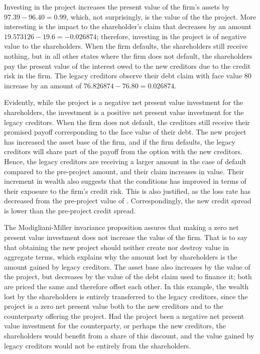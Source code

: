 \documentclass[main.tex]{subfiles}
\begin{document}
        Investing in the project increases the present value of the firm's assets by $\num{97.39} - \num{96.40} = \num{0.99}$, 
        which, not surprisingly, is the value of the the project.
        More interesting is the impact to the shareholder's claim that decreases by an amount $\num{19.573126} - \num{19.6} = \num{-0.026874}$; 
        therefore, investing in the project is of negative value to the shareholders.
        When the firm defaults, the shareholders still receive nothing, 
        but in all other states where the firm does not default, 
        the shareholders pay the present value of the interest owed to the new creditors 
        due to the credit risk in the firm.
        The legacy creditors observe their debt claim with face value $\num{80}$ increase by an amount of
        $\num{76.826874} - \num{76.80} = \num{0.026874}$.

        Evidently, while the project is a negative net present value investment for the shareholders,
        the investment is a positive net present value investment for the legacy creditors.
        When the firm does not default, the creditors still receive their promised payoff 
        corresponding to the face value of their debt.
        The new project has increased the asset base of the firm, and if the firm defaults, 
        the legacy creditors will share part of the payoff from the option with the new creditors.
        Hence, the legacy creditors are receiving a larger amount in the case of default compared to the pre-project amount, and their claim increases in value.
        Their increment in wealth also suggests that the conditions has improved in terms of their exposure to the firm's credit risk.
        This is also justified, as the loss rate has decreased from the pre-project value of .
        Correspondingly, the new credit spread is lower than the pre-project credit spread.

        The Modigliani-Miller invariance proposition assures that making a zero net present value investment 
        does not increase the value of the firm.
        That is to say that obtaining the new project should neither create nor destroy value in aggregate terms,
        which explains why the amount lost by shareholders is the amount gained by legacy creditors.
        The asset base also increases by the value of the project, 
        but decreases by the value of the debt claim used to finance it; 
        both are priced the same and therefore offset each other.
        In this example, the wealth lost by the shareholders is entirely transferred to the legacy creditors,
        since the project is a zero net present value both to the new creditors 
        and to the counterparty offering the project.
        Had the project been a negative net present value investment for the counterparty, 
        or perhaps the new creditors, the shareholders would benefit from a share of this discount,
        and the value gained by legacy creditors would not be entirely from the shareholders.
\end{document}

